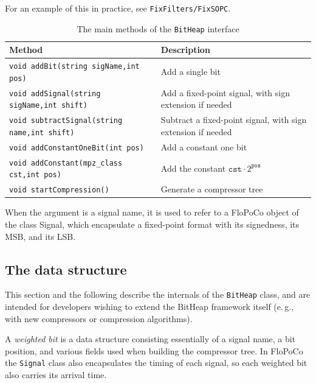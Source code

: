 \documentclass{article}
\begin{document}
For an example of this in practice, see \texttt{FixFilters/FixSOPC}.

\begin{table}[t]
  \centering
    \begin{center}
      \caption{The main methods of the \texttt{BitHeap} interface}
	\label{tab:bit_heap_interface}
  \footnotesize
  
    \begin{tabular}{L{0.5\textwidth}L{0.4\textwidth}}
    	\toprule
		Method                                        & Description                                      \\
    	\midrule
      {\texttt{void addBit(string sigName,int pos)}}      & Add a single bit                                 \\
      {\texttt{void addSignal(string sigName,int shift)}}   & Add a fixed-point signal, with sign extension if needed                       \\
      {\texttt{void subtractSignal(string name,int shift)}} & Subtract a fixed-point signal, with sign extension if needed                  \\
      {\texttt{void addConstantOneBit(int pos)}}  & Add a constant one bit                           \\[1ex]
      {\texttt{void addConstant(mpz\_class cst,int pos)}} & Add the constant $\mathtt{cst}\cdot 2^{\mathtt{pos}}$ \\
      {\texttt{void startCompression()}}          & Generate a compressor tree                       \\
    	\bottomrule
    \end{tabular}
        When the argument is a signal name, it is used to refer to a FloPoCo object of the class Signal, which encapsulate a fixed-point format with its  signedness, its MSB, and its LSB.
    \end{center}
\end{table}



\subsection{The data structure}
This section and the following describe the internals of the \texttt{BitHeap} class, and are intended for developers wishing to extend the BitHeap framework itself (e.\,g., with new compressors or compression algorithms).

A \emph{weighted bit} is a data structure consisting essentially of a signal name, a bit position, and various fields used when building the compressor tree.
In FloPoCo the \texttt{Signal} class also encapsulates the timing of each signal, so each weighted bit also carries its arrival time.
\end{document}
